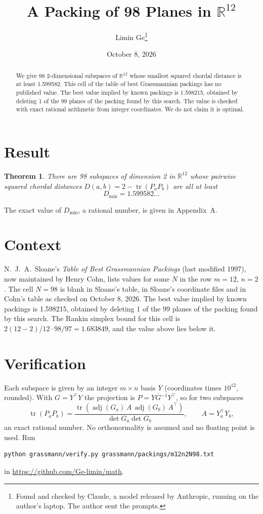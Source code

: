 \documentclass[11pt,a4paper]{article}
\title{A Packing of 98 Planes in $\mathbb{R}^{12}$}
\author{Limin Ge\thanks{Found and checked by Claude, a model released by Anthropic, running on the author's laptop. The author sent the prompts.}}
\date{October 8, 2026}
\newtheorem*{theorem}{Theorem}
\begin{document}
\maketitle
\begin{abstract}
We give 98 2-dimensional subspaces of $\mathbb{R}^{12}$ whose smallest squared chordal distance is at least 1.599582. This cell of the table of best Grassmannian packings has no published value. The best value implied by known packings is 1.598215, obtained by deleting 1 of the 99 planes of the packing found by this search. The value is checked with exact rational arithmetic from integer coordinates. We do not claim it is optimal.
\end{abstract}

\section{Result}
\begin{theorem}
There are 98 subspaces of dimension 2 in $\mathbb{R}^{12}$ whose pairwise squared chordal distances $D(a,b) = 2 - \operatorname{tr}(P_aP_b)$ are all at least
\[ D_{\min} = 1.599582\ldots \]
\end{theorem}
The exact value of $D_{\min}$, a rational number, is given in Appendix~A.


\section{Context}
N.~J.~A.~Sloane's \emph{Table of Best Grassmannian Packings} (last modified 1997), now maintained by Henry Cohn, lists values for some $N$ in the row $m=12$, $n=2$. The cell $N=98$ is blank in Sloane's table, in Sloane's coordinate files and in Cohn's table as checked on October 8, 2026. The best value implied by known packings is 1.598215, obtained by deleting 1 of the 99 planes of the packing found by this search. The Rankin simplex bound for this cell is $2(12-2)/12\cdot 98/97 = 1.683849$, and the value above lies below it.


\section{Verification}
Each subspace is given by an integer $m\times n$ basis $Y$ (coordinates times $10^{12}$, rounded). With $G=Y^\top Y$ the projection is $P=YG^{-1}Y^\top$, so for two subspaces
\[ \operatorname{tr}(P_aP_b)=\frac{\operatorname{tr}(\operatorname{adj}(G_a)\,A\,\operatorname{adj}(G_b)\,A^\top)}{\det G_a\det G_b},\qquad A=Y_a^\top Y_b, \]
an exact rational number. No orthonormality is assumed and no floating point is used. Run
\begin{verbatim}
python grassmann/verify.py grassmann/packings/m12n2N98.txt
\end{verbatim}
in \url{https://github.com/Ge-limin/math}.
\end{document}
